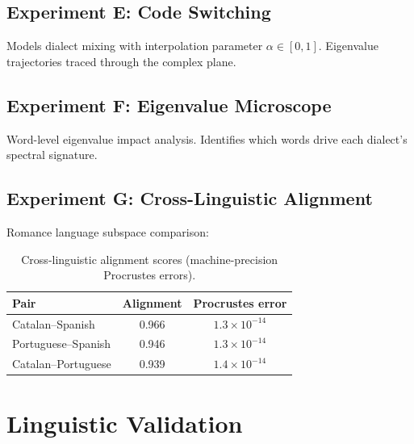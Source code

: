 \documentclass[11pt,a4paper]{article}
\begin{document}
\subsection{Experiment E: Code Switching}

Models dialect mixing with interpolation parameter $\alpha \in [0,1]$. Eigenvalue trajectories traced through the complex plane.

\subsection{Experiment F: Eigenvalue Microscope}

Word-level eigenvalue impact analysis. Identifies which words drive each dialect's spectral signature.

\subsection{Experiment G: Cross-Linguistic Alignment}

Romance language subspace comparison:

\begin{table}[H]
\centering
\begin{tabular}{@{}lcc@{}}
\toprule
\textbf{Pair} & \textbf{Alignment} & \textbf{Procrustes error} \\
\midrule
Catalan--Spanish & 0.966 & $1.3 \times 10^{-14}$ \\
Portuguese--Spanish & 0.946 & $1.3 \times 10^{-14}$ \\
Catalan--Portuguese & 0.939 & $1.4 \times 10^{-14}$ \\
\bottomrule
\end{tabular}
\caption{Cross-linguistic alignment scores (machine-precision Procrustes errors).}
\end{table}

\section{Linguistic Validation}
\end{document}
